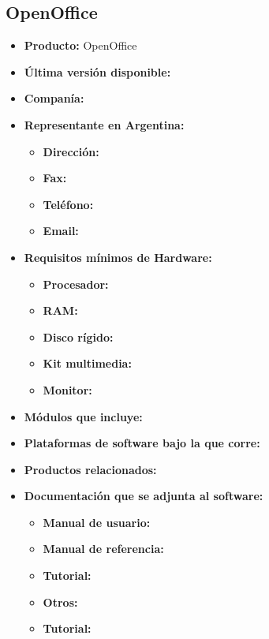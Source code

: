 \subsection{OpenOffice}

\begin{itemize}
  \item \textbf{Producto:} OpenOffice
  \item \textbf{Última versión disponible:}
  \item \textbf{Companía:}

  \item \textbf{Representante en Argentina:}
    \begin{itemize}
      \item \textbf{Dirección:}
      \item \textbf{Fax:}
      \item \textbf{Teléfono:}
      \item \textbf{Email:}
    \end{itemize}

  \item \textbf{Requisitos mínimos de Hardware:}
    \begin{itemize}
      \item \textbf{Procesador:}
      \item \textbf{RAM:}
      \item \textbf{Disco rígido:}
      \item \textbf{Kit multimedia:}
      \item \textbf{Monitor:}
    \end{itemize}

    \item \textbf{Módulos que incluye:}
    \item \textbf{Plataformas de software bajo la que corre:}
    \item \textbf{Productos relacionados:}

    \item \textbf{Documentación que se adjunta al software:}
      \begin{itemize}
        \item \textbf{Manual de usuario:}
        \item \textbf{Manual de referencia:}
        \item \textbf{Tutorial:}
        \item \textbf{Otros:}
        \item \textbf{Tutorial:}
      \end{itemize}


\end{itemize}
